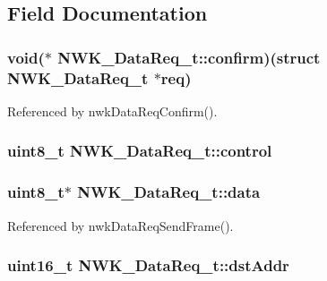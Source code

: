 \subsection{Field Documentation}
\hypertarget{struct_n_w_k___data_req__t_a63681af7f9b5392167e681790d9d0f70}{
\subsubsection[{confirm}]{\setlength{\rightskip}{0pt plus 5cm}void($\ast$ N\-W\-K\-\_\-\-Data\-Req\-\_\-t\-::confirm)(struct {\bf N\-W\-K\-\_\-\-Data\-Req\-\_\-t} $\ast$req)}}\label{struct_n_w_k___data_req__t_a63681af7f9b5392167e681790d9d0f70}


Referenced by nwk\-Data\-Req\-Confirm().

\hypertarget{struct_n_w_k___data_req__t_aeb53342e48a4c8f2864dcde773f15f77}{
\subsubsection[{control}]{\setlength{\rightskip}{0pt plus 5cm}uint8\-\_\-t N\-W\-K\-\_\-\-Data\-Req\-\_\-t\-::control}}\label{struct_n_w_k___data_req__t_aeb53342e48a4c8f2864dcde773f15f77}
\hypertarget{struct_n_w_k___data_req__t_a36517216442cbc732d1197cef8307daf}{
\subsubsection[{data}]{\setlength{\rightskip}{0pt plus 5cm}uint8\-\_\-t$\ast$ N\-W\-K\-\_\-\-Data\-Req\-\_\-t\-::data}}\label{struct_n_w_k___data_req__t_a36517216442cbc732d1197cef8307daf}


Referenced by nwk\-Data\-Req\-Send\-Frame().

\hypertarget{struct_n_w_k___data_req__t_aeaec216601ad5b729ed4fca5ec34c0e4}{
\subsubsection[{dst\-Addr}]{\setlength{\rightskip}{0pt plus 5cm}uint16\-\_\-t N\-W\-K\-\_\-\-Data\-Req\-\_\-t\-::dst\-Addr}}\label{struct_n_w_k___data_req__t_aeaec216601ad5b729ed4fca5ec34c0e4}


